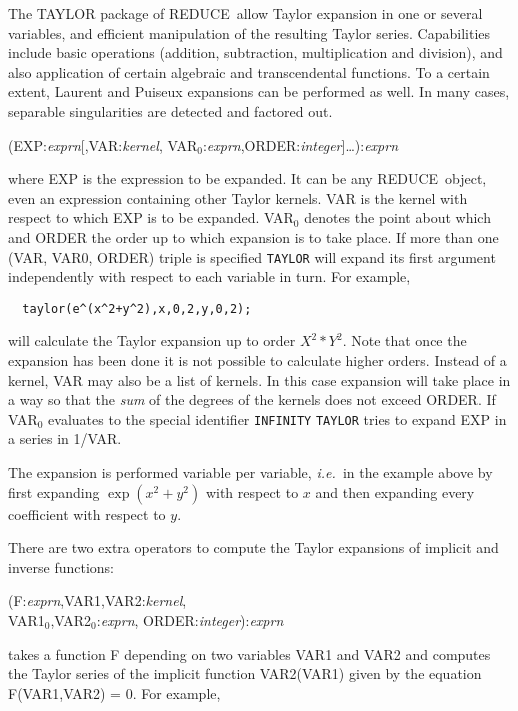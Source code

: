 \documentclass[11pt,letterpaper]{book}
\newcommand{\REDUCE}{REDUCE}
\begin{document}
The TAYLOR package of \REDUCE\ allow Taylor expansion in one or
several variables, and efficient manipulation of the resulting Taylor
series. Capabilities include basic operations (addition, subtraction,
multiplication and division), and also application of certain
algebraic and transcendental functions. To a certain extent, Laurent
and Puiseux expansions can be performed as well.  In many cases,
separable singularities are detected and factored out.

(EXP:{\em exprn}[,VAR:{\em kernel},
            VAR$_0$:{\em exprn},ORDER:{\em integer}]\ldots):{\em exprn}

where EXP is the expression to be expanded.  It can be any \REDUCE\
object, even an expression containing other Taylor kernels.  VAR is
the kernel with respect to which EXP is to be expanded.  VAR$_0$
denotes the point about which and ORDER the order up to which
expansion is to take place.  If more than one (VAR, VAR0, ORDER) triple
is specified {\tt TAYLOR} will expand its first argument independently
with respect to each variable in turn.  For example,

{\small\begin{verbatim}
  taylor(e^(x^2+y^2),x,0,2,y,0,2);
\end{verbatim}}

will calculate the Taylor expansion up to order $X^{2}*Y^{2}$.
Note that once the expansion has been done it is not possible to
calculate higher orders.
Instead of a kernel, VAR may also
be a list of kernels. In this case expansion will take place in a way
so that the {\em sum\/} of the degrees of the kernels does not exceed
ORDER.
If VAR$_0$ evaluates to the special identifier \verb|INFINITY|
{\tt TAYLOR} tries to expand EXP in a series in 1/VAR.

The expansion is performed variable per variable, {\em i.e.\ }in the
example above by first expanding $\exp(x^{2}+y^{2})$ with respect
to $x$ and then expanding every coefficient with respect to $y$.

 There are two
extra operators to compute the Taylor expansions of implicit and
inverse functions:

(F:{\em exprn},VAR1,VAR2:{\em kernel},\\
\hphantom{{\tt IMPLICIT\_TAYLOR}(}VAR1$_0$,VAR2$_0$:{\em exprn},
                                 ORDER:{\em integer}):{\em exprn}

takes a function F depending on two variables VAR1 and VAR2 and
computes the Taylor series of the implicit function VAR2(VAR1)
given by the equation F(VAR1,VAR2) = 0.  For example,
\end{document}
